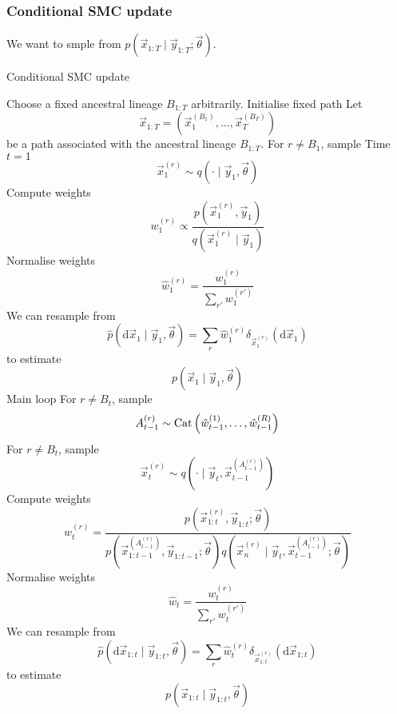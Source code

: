 \subsubsection{Conditional SMC update}
We want to smple from $p(\vec x_{1:T} \mid \vec y_{1:T}; \vec \theta)$.
    \begin{algorithm}
    \caption{Conditional SMC update}\label{alg:csmc}
        \begin{algorithmic}[1]
            \State Choose a fixed ancestral lineage $B_{1:T}$ arbitrarily. \Comment Initialise fixed path
            \State Let
                $$\vec x_{1:T} = \left(\vec x_1^{(B_1)}, \dotsc, \vec x_T^{(B_T)}\right)$$
                be a path associated with the ancestral lineage $B_{1:T}$.
            \State For $r \neq B_1$, sample \Comment Time $t = 1$
                $$\vec x_1^{(r)} \sim q(\cdot \mid \vec y_1, \vec \theta)$$
            \State Compute weights
                $$w_1^{(r)} \propto \frac{p\left(\vec x_1^{(r)}, \vec y_1\right)}{q\left(\vec x_1^{(r)} \mid \vec y_1\right)}$$
            \State Normalise weights
                $$\hat w_1^{(r)} = \frac{w_1^{(r)}}{\sum_{r'} w_1^{(r')}}$$
            \State We can resample from 
                $$\hat p(\mathrm d \vec x_1 \mid \vec y_1, \vec \theta) = \sum_r \hat w_1^{(r)} \delta_{\vec x_1^{(r)}}(\mathrm d\vec x_1)$$
                to estimate
                $$p(\vec x_1 \mid \vec y_1, \vec \theta)$$
             \Comment Main loop
                \State For $r \neq B_t$, sample
                    $$A_{t - 1}^{(r)} \sim \operatorname{Cat}\left(\hat w_{t - 1}^{(1)}, \dotsc, \hat w_{t - 1}^{(R)}\right)$$
                \State For $r \neq B_t$, sample
                    $$\vec x_t^{(r)} \sim q\left(\cdot \mid \vec y_t, \vec x_{t - 1}^{(A_{t - 1}^{(r)})}\right)$$
                \State Compute weights
                    $$w_t^{(r)} = \frac{p\left(\vec x_{1:t}^{(r)}, \vec y_{1:t}; \vec \theta\right)}{p\left(\vec x_{1:t - 1}^{\left(A_{t - 1}^{(r)}\right)}, \vec y_{1:t-1}; \vec \theta\right) q\left(\vec x_n^{(r)} \mid \vec y_t, \vec x_{t - 1}^{\left(A_{t - 1}^{(r)}\right)}; \vec \theta\right)}$$
                \State Normalise weights
                    $$\hat w_t = \frac{w_t^{(r)}}{\sum_{r'} w_t^{(r')}}$$
                \State We can resample from
                    $$\hat p(\mathrm d \vec x_{1:t} \mid \vec y_{1:t}, \vec \theta) = \sum_r \hat w_t^{(r)} \delta_{\vec x_{1:t}^{(r)}}(\mathrm d \vec x_{1:t})$$
                    to estimate
                    $$p(\vec x_{1:t} \mid \vec y_{1:t}, \vec \theta)$$
            \EndFor
        \end{algorithmic}
    \end{algorithm}